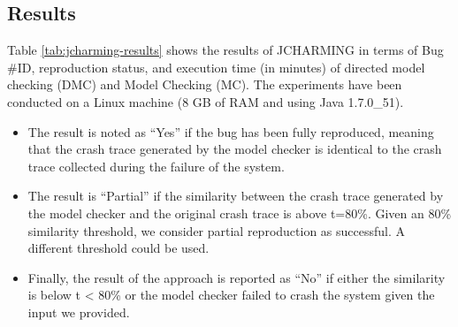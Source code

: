 \subsection{Results}

Table \ref{tab:jcharming-results} shows the results of JCHARMING in terms of Bug
\#ID, reproduction status, and execution time (in minutes) of
directed model checking (DMC) and Model Checking (MC).
The experiments have been conducted on a Linux machine (8
GB of RAM and using Java 1.7.0\_51).

\begin{itemize}
  \item The result is noted as ``Yes'' if the bug has been fully
reproduced, meaning that the crash trace generated by the
model checker is identical to the crash trace collected
during the failure of the system.
\item The result is ``Partial'' if the similarity between the crash
trace generated by the model checker and the original
crash trace is above t=80\%. Given an 80\% similarity
threshold, we consider partial reproduction as successful.
A different threshold could be used.
\item Finally, the result of the approach is reported as ``No'' if
either the similarity is below t < 80\% or the model
checker failed to crash the system given the input we
provided.
\end{itemize}

